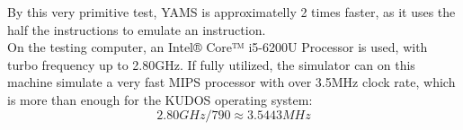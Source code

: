 %
%
%
%
%

By this very primitive test, YAMS is approximatelly 2 times faster, as it uses
the half the instructions to emulate an instruction.\\
On the testing computer, an Intel® Core™ i5-6200U Processor is used, with turbo
frequency up to 2.80GHz\cite{intel:i5}. If fully utilized, the simulator can on
this machine simulate a very fast MIPS processor with over 3.5MHz clock rate,
which is more than enough for the KUDOS operating system:
$$2.80GHz / 790 \approx 3.5443MHz$$

